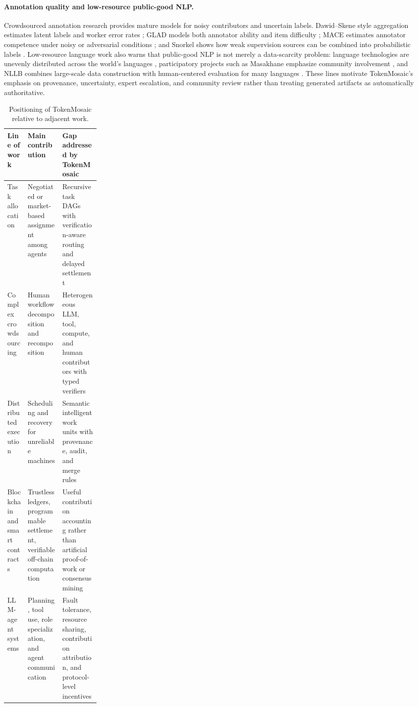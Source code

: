 \documentclass{article}
\theoremstyle{plain}
\begin{document}
\paragraph{Annotation quality and low-resource public-good NLP.}
Crowdsourced annotation research provides mature models for noisy contributors and uncertain labels. Dawid--Skene style aggregation estimates latent labels and worker error rates \citep{dawid1979maximum}; GLAD models both annotator ability and item difficulty \citep{whitehill2009glad}; MACE estimates annotator competence under noisy or adversarial conditions \citep{hovy2013mace}; and Snorkel shows how weak supervision sources can be combined into probabilistic labels \citep{ratner2017snorkel}. Low-resource language work also warns that public-good NLP is not merely a data-scarcity problem: language technologies are unevenly distributed across the world's languages \citep{joshi2020state}, participatory projects such as Masakhane emphasize community involvement \citep{nekoto2020participatory}, and NLLB combines large-scale data construction with human-centered evaluation for many languages \citep{nllb2022}. These lines motivate TokenMosaic's emphasis on provenance, uncertainty, expert escalation, and community review rather than treating generated artifacts as automatically authoritative.





\begin{table}[t]
\centering
\small
\caption{Positioning of TokenMosaic relative to adjacent work.}
\label{tab:related_positioning}
\begin{tabularx}{\linewidth}{p{0.22\linewidth} X X}
\toprule
Line of work & Main contribution & Gap addressed by TokenMosaic \\
\midrule
Task allocation & Negotiated or market-based assignment among agents & Recursive task DAGs with verification-aware routing and delayed settlement \\
Complex crowdsourcing & Human workflow decomposition and recomposition & Heterogeneous LLM, tool, compute, and human contributors with typed verifiers \\
Distributed execution & Scheduling and recovery for unreliable machines & Semantic intelligent work units with provenance, audit, and merge rules \\
Blockchain and smart contracts & Trustless ledgers, programmable settlement, verifiable off-chain computation & Useful contribution accounting rather than artificial proof-of-work or consensus mining \\
LLM-agent systems & Planning, tool use, role specialization, and agent communication & Fault tolerance, resource sharing, contribution attribution, and protocol-level incentives \\
\bottomrule
\end{tabularx}
\end{table}
\end{document}
